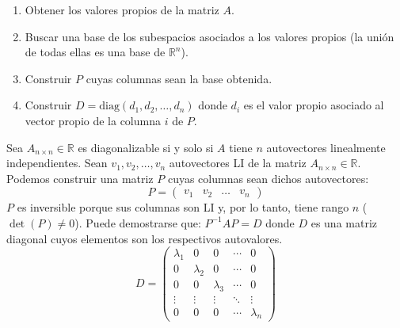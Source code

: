 \begin{enumerate}
    \item Obtener los valores propios de la matriz $A$.
    \item Buscar una base de los subespacios asociados a los valores propios (la unión de todas ellas es una base de $\mathbb{R}^n$).
    \item Construir $P$ cuyas columnas sean la base obtenida.
    \item Construir $D = \text{diag}(d_1, d_2, \dots, d_n)$ donde $d_i$ es el valor propio asociado al vector propio de la columna $i$ de $P$.
\end{enumerate}
Sea \( A_{n \times n} \in \mathbb{R} \) es diagonalizable si y solo si \( A \) tiene \( n \) autovectores linealmente independientes. Sean \( v_1, v_2, \ldots, v_n \) autovectores LI de la matriz \( A_{n \times n} \in \mathbb{R} \). Podemos construir una matriz \( P \) cuyas columnas sean dichos autovectores:
\[ P = \begin{pmatrix} v_1 & v_2 & \ldots & v_n \end{pmatrix} \]
\( P \) es inversible porque sus columnas son LI y, por lo tanto, tiene rango \( n \) (\( \det(P) \neq 0 \)). Puede demostrarse que: \( P^{-1}AP = D \) donde \( D \) es una matriz diagonal cuyos elementos son los respectivos autovalores.
$$
D = \begin{pmatrix}
\lambda_1 & 0 & 0 & \cdots & 0 \\
0 & \lambda_2 & 0 & \cdots & 0 \\
0 & 0 & \lambda_3 & \cdots & 0 \\
\vdots & \vdots & \vdots & \ddots & \vdots \\
0 & 0 & 0 & \cdots & \lambda_n
\end{pmatrix}$$

